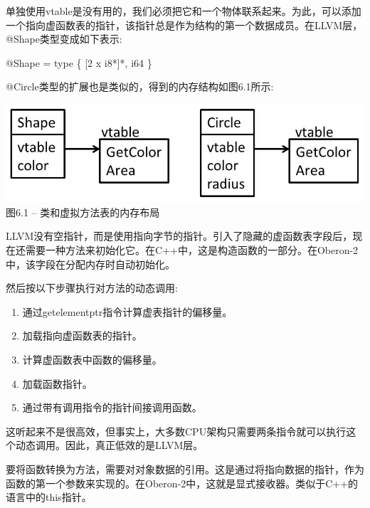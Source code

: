 单独使用vtable是没有用的，我们必须把它和一个物体联系起来。为此，可以添加一个指向虚函数表的指针，该指针总是作为结构的第一个数据成员。在LLVM层，@Shape类型变成如下表示:\par

\begin{tcolorbox}[colback=white,colframe=black]
@Shape = type \{ [2 x i8*]*, i64 \}
\end{tcolorbox}

@Circle类型的扩展也是类似的，得到的内存结构如图6.1所示:\par

\hspace*{\fill} \par %
\begin{center}
\includegraphics{content/2/chapter6/images/1.jpg}\\
图6.1 – 类和虚拟方法表的内存布局
\end{center}

LLVM没有空指针，而是使用指向字节的指针。引入了隐藏的虚函数表字段后，现在还需要一种方法来初始化它。在C++中，这是构造函数的一部分。在Oberon-2中，该字段在分配内存时自动初始化。\par

然后按以下步骤执行对方法的动态调用:\par

\begin{enumerate}
\item 通过getelementptr指令计算虚表指针的偏移量。
\item 加载指向虚函数表的指针。
\item 计算虚函数表中函数的偏移量。
\item 加载函数指针。
\item 通过带有调用指令的指针间接调用函数。
\end{enumerate}

这听起来不是很高效，但事实上，大多数CPU架构只需要两条指令就可以执行这个动态调用。因此，真正低效的是LLVM层。\par

要将函数转换为方法，需要对对象数据的引用。这是通过将指向数据的指针，作为函数的第一个参数来实现的。在Oberon-2中，这就是显式接收器。类似于C++的语言中的this指针。\par

